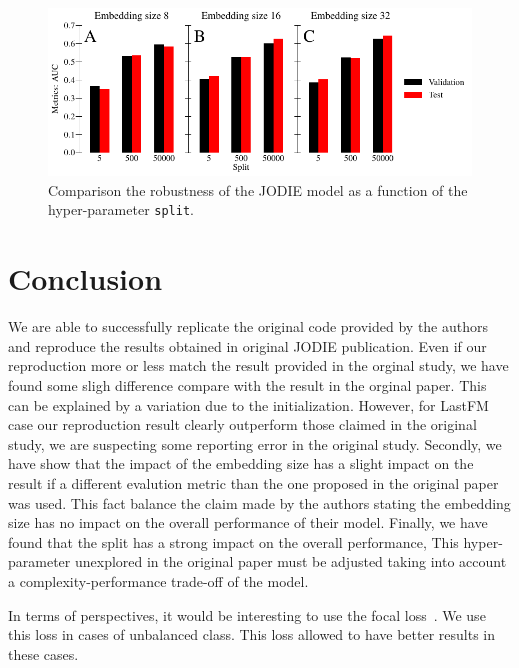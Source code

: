 \begin{figure}[htbp]
    \centering
    \includegraphics[width = \textwidth]{image/split.pdf}
    \caption{Comparison the robustness of the JODIE model as a function of the hyper-parameter \texttt{split}.}
    \label{split}
\end{figure}

\section*{Conclusion}
We are able to successfully replicate the original code provided by the authors and reproduce the results obtained in original JODIE publication. Even if our reproduction more or less match the result provided in the orginal study, we have found some sligh difference compare with the result in the orginal paper. This can be explained by a variation due to the initialization. However, for LastFM case our reproduction result clearly outperform those claimed in the original study, we are suspecting some reporting error in the original study. Secondly, we have show that the impact of the embedding size has a slight impact on the result if a different evalution metric than the one proposed in the original paper was used. This fact balance the claim made by the authors stating the embedding size has no impact on the overall performance of their model. Finally, we have found that the split has a strong impact on the overall performance, This hyper-parameter unexplored in the original paper must be adjusted taking into account a complexity-performance trade-off of the model.

In terms of perspectives, it would be interesting to use the focal loss~\cite{https://doi.org/10.48550/arxiv.1708.02002}. We use this loss in cases of unbalanced class. This loss allowed to have better results in these cases.

